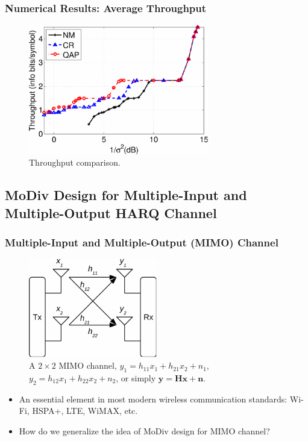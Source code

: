 \documentclass{beamer}
\begin{document}
\begin{frame}
  \frametitle{Numerical Results: Average Throughput}
  \begin{figure}
    \includegraphics[width=0.7\textwidth]{figs/throughput_6M_64QAM.pdf}
    \caption{Throughput comparison.}
  \end{figure}
\end{frame}

\subsection[MoDiv for MIMO-HARQ]{MoDiv Design for Multiple-Input and
Multiple-Output HARQ Channel}
\begin{frame}
  \frametitle{Multiple-Input and Multiple-Output (MIMO) Channel}
  \begin{figure}
    \includegraphics[width=0.5\textwidth]{figs/mimo.pdf}
    \caption{A $2\times 2$ MIMO channel, $y_1 = h_{11}x_1 + h_{21}x_2 + n_1$,
    $y_2 = h_{12}x_1 + h_{22}x_2 + n_2$, or simply $\mathbf{y} = \mathbf{Hx}
    + \mathbf{n}$.}
  \end{figure}
  \begin{itemize}
    \item An essential element in most modern wireless communication standards:
    Wi-Fi, HSPA+, LTE, WiMAX, etc.
    \item How do we generalize the idea of MoDiv design for MIMO channel?
  \end{itemize}
\end{frame}
\end{document}
